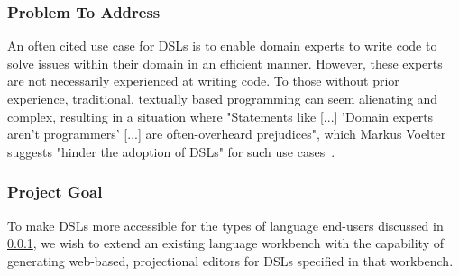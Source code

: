 \documentclass{article}
\begin{document}
\subsubsection{Problem To Address}\label{problem}

An often cited use case for DSLs is to enable domain experts to write code to solve issues within their domain in an efficient manner. However, these experts are not necessarily experienced at writing code. To those without prior experience, traditional, textually based programming can seem alienating and complex, resulting in a situation where "Statements like [...] 'Domain experts aren't programmers' [...] are often-overheard prejudices", which Markus Voelter suggests "hinder the adoption of DSLs" for such use cases~\cite[pg.45]{dslEngineering}.

\subsubsection{Project Goal}\label{goal}
To make DSLs more accessible for the types of language end-users discussed in \ref{problem}, we wish to extend an existing language workbench with the capability of generating web-based, projectional editors for DSLs specified in that workbench. 
\end{document}
